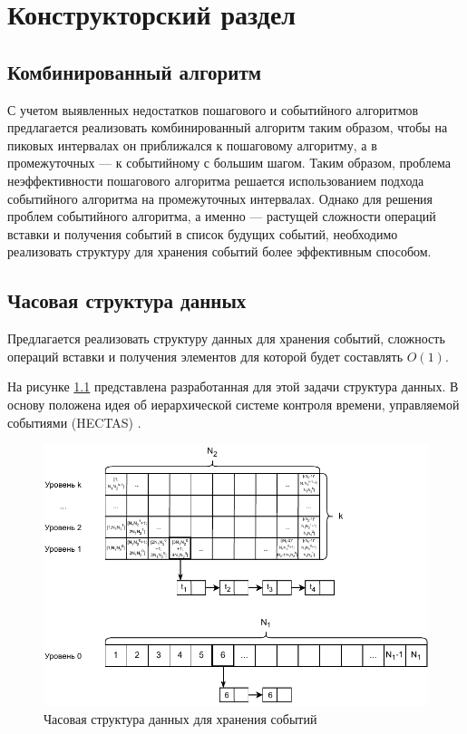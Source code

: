 \chapter{Конструкторский раздел}

\section{Комбинированный алгоритм}
С учетом выявленных недостатков пошагового и событийного алгоритмов предлагается реализовать комбинированный алгоритм таким образом, чтобы на пиковых интервалах он приближался к пошаговому алгоритму, а в промежуточных --- к событийному с большим шагом. Таким образом, проблема неэффективности пошагового алгоритма решается использованием подхода событийного алгоритма на промежуточных интервалах. Однако для решения проблем событийного алгоритма, а именно --- растущей сложности операций вставки и получения событий в список будущих событий, необходимо реализовать структуру для хранения событий более эффективным способом.

\section{Часовая структура данных}
Предлагается реализовать структуру данных для хранения событий, сложность операций вставки и получения элементов для которой будет составлять $O(1)$.

На рисунке \ref{img:hybrid_structure} представлена разработанная для этой задачи структура данных. В основу положена идея об иерархической системе контроля времени, управляемой событиями (HECTAS) \cite{system_modelling_eng}.

\begin{figure}[h!btp]
	\centering
	\includegraphics[width=1\columnwidth]{inc/img/hybrid_structure.pdf}
	\caption{Часовая структура данных для хранения событий}
	\label{img:hybrid_structure}	
\end{figure}

